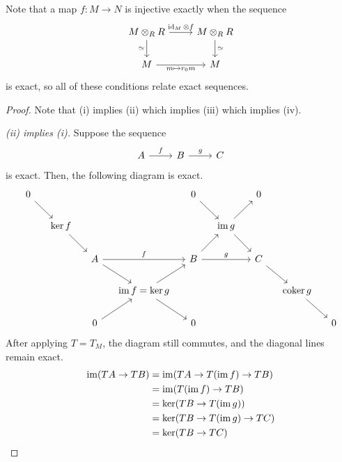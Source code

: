 Note that a map \( f : M \to N \) is injective exactly when the sequence
\[\begin{tikzcd}
	{M \otimes_R R} & {M \otimes_R R} \\
	M & M
	\arrow["{\id_M \otimes f}", from=1-1, to=1-2]
	\arrow["\simeq", from=1-2, to=2-2]
	\arrow["\simeq"', from=1-1, to=2-1]
	\arrow["{m \mapsto r_0 m}"', from=2-1, to=2-2]
\end{tikzcd}\]
is exact, so all of these conditions relate exact sequences.
\begin{proof}
    Note that (i) implies (ii) which implies (iii) which implies (iv).

    \emph{(ii) implies (i).}
    Suppose the sequence
\[\begin{tikzcd}
	A & B & C
	\arrow["f", from=1-1, to=1-2]
	\arrow["g", from=1-2, to=1-3]
\end{tikzcd}\]
    is exact.
    Then, the following diagram is exact.
\[\begin{tikzcd}[column sep=small]
	0 &&&& 0 && 0 \\
	& {\ker f} &&&& {\im g} \\
	&& A && B && C \\
	&&& {\im f = \ker g} &&&& {\coker g} \\
	&& 0 && 0 &&&& 0
	\arrow["f", from=3-3, to=3-5]
	\arrow["g", from=3-5, to=3-7]
	\arrow[from=2-2, to=3-3]
	\arrow[from=3-3, to=4-4]
	\arrow[from=4-4, to=5-5]
	\arrow[from=1-1, to=2-2]
	\arrow[from=5-3, to=4-4]
	\arrow[from=4-4, to=3-5]
	\arrow[from=3-5, to=2-6]
	\arrow[from=2-6, to=1-7]
	\arrow[from=1-5, to=2-6]
	\arrow[from=2-6, to=3-7]
	\arrow[from=3-7, to=4-8]
	\arrow[from=4-8, to=5-9]
\end{tikzcd}\]
    After applying \( T = T_M \), the diagram still commutes, and the diagonal lines remain exact.
    \begin{align*}
        \operatorname{im}(TA \to TB) &= \operatorname{im}(TA \to T(\operatorname{im} f) \to TB) \\
        &= \operatorname{im} (T(\operatorname{im} f) \to TB) \\
        &= \ker (TB \to T(\operatorname{im} g)) \\
        &= \ker (TB \to T(\operatorname{im} g) \to TC) \\
        &= \ker (TB \to TC)
    \end{align*}


\end{proof}
